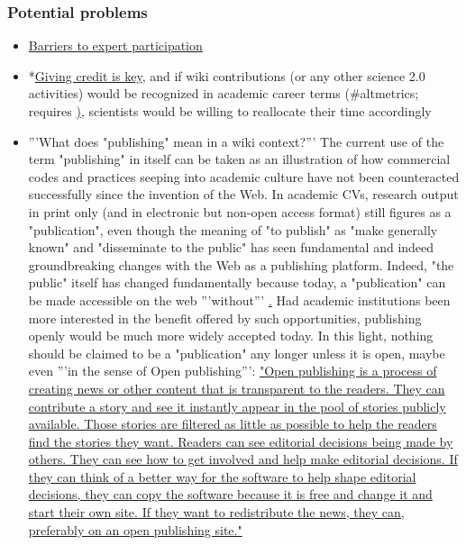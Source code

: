 \documentclass[final,authoryear,3p]{elsarticle-open-drafting}
\begin{document}
\subsubsection{Potential problems}
\begin{itemize}
	\item \href{http://wikimania2011.wikimedia.org/wiki/Submissions/Barriers_and_opportunities_for_expert_participation_in_Wikipedia:_Results_from_a_survey}{Barriers to expert participation}
	\item *\href{http://cameronneylon.net/blog/michael-nielsen-the-credit-economy-and-open-science/}{Giving credit is key}, and if wiki contributions (or any other science 2.0 activities) would be recognized in academic career terms (\#altmetrics; requires \href{http://marciovm.com/michael-nielsen-on-the-future-of-science functional reputation systems}), scientists would be willing to reallocate their time accordingly


	\item '''What does "publishing" mean in a wiki context?''' The current use of the term "publishing" in itself can be taken as an 
	illustration of how commercial codes and practices seeping into academic culture have not been counteracted successfully 
	since the invention of the Web. In academic CVs, research output in print only (and in electronic but non-open access 
	format) still figures as a "publication", even though the meaning of "to publish" as "make generally known" and "disseminate 
	to the public" has seen fundamental and indeed groundbreaking changes with the Web as a publishing platform. Indeed, 
	"the public" itself has changed fundamentally because today, a "publication" can be made accessible on the web '''without''' 
	\href{http://scientopia.org/blogs/bookoftrogool/2010/03/15/battle-of-the-opens/ "a subscription, per-article, or other fee ... by 
	the reader or the reader's proxy (e.g. a library)"}. Had academic institutions been more interested in the benefit offered by 
	such opportunities, publishing openly would be much more widely accepted today. In this light, nothing should be claimed 
	to be a "publication" any longer unless it is open, maybe even '''in the sense of Open publishing''': 
	\href{http://en.wikipedia.org/w/index.php?title=Special:Cite&page=Open_publishing&id=383242580}{"Open publishing is a 
	process of creating news or other content that is transparent to the readers. They can contribute a story and see it instantly 
	appear in the pool of stories publicly available. Those stories are filtered as little as possible to help the readers find the 
	stories they want. Readers can see editorial decisions being made by others. They can see how to get involved and help 
	make editorial decisions. If they can think of a better way for the software to help shape editorial decisions, they can copy 
	the software because it is free and change it and start their own site. If they want to redistribute the news, they can, 
	preferably on an open publishing site."}
\end{itemize}
\end{document}
